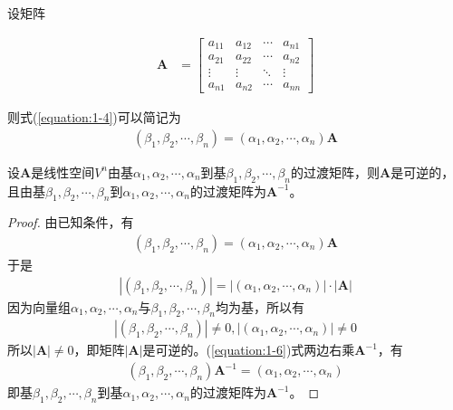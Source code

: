 设矩阵

\begin{eqnarray}
    \textbf{A}&=\left[\begin{array}{cccc}
        a_{11}&a_{12}&\cdots&a_{n1}\\
        a_{21}&a_{22}&\cdots&a_{n2}\\
        \vdots&\vdots&\ddots&\vdots\\
        a_{n1}&a_{n2}&\cdots&a_{nn}
    \end{array}\right]
\end{eqnarray}

则式(\ref{equation:1-4})可以简记为
\begin{eqnarray}
    \left(\beta_{1},\beta_{2},\cdots,\beta_{n}\right)=\left(\alpha_{1},\alpha_{2},\cdots,\alpha_{n}\right)\mathbf{A}\label{equation:1-6}
\end{eqnarray}

\begin{theorem}
    设$\mathbf{A}$是线性空间$V^{n}$由基$\alpha_{1},\alpha_{2},\cdots,\alpha_{n}$到基$\beta_{1},\beta_{2},\cdots,\beta_{n}$的过渡矩阵，则$\mathbf{A}$是可逆的，且由基$\beta_{1},\beta_{2},\cdots,\beta_{n}$到$\alpha_{1},\alpha_{2},\cdots,\alpha_{n}$的过渡矩阵为$\mathbf{A}^{-1}$。
\end{theorem}

\begin{proof}
    由已知条件，有
    \begin{eqnarray}
        \left(\beta_{1},\beta_{2},\cdots,\beta_{n}\right)=\left(\alpha_{1},\alpha_{2},\cdots,\alpha_{n}\right)\mathbf{A}\nonumber
    \end{eqnarray}
    于是
    \begin{eqnarray}
        \left|\left(\beta_{1},\beta_{2},\cdots,\beta_{n}\right)\right|=\left|\left(\alpha_{1},\alpha_{2},\cdots,\alpha_{n}\right)\right|\cdot\left|\mathbf{A}\right|\nonumber
    \end{eqnarray}
    因为向量组$\alpha_{1},\alpha_{2},\cdots,\alpha_{n}$与$\beta_{1},\beta_{2},\cdots,\beta_{n}$均为基，所以有
    \begin{eqnarray}
        \left|\left(\beta_{1},\beta_{2},\cdots,\beta_{n}\right)\right|\neq{0},\left|\left(\alpha_{1},\alpha_{2},\cdots,\alpha_{n}\right)\right|\neq{0}\nonumber
    \end{eqnarray}
    所以$\left|\mathbf{A}\right|\neq{0}$，即矩阵$\left|\mathbf{A}\right|$是可逆的。(\ref{equation:1-6})式两边右乘$\mathbf{A}^{-1}$，有
    \begin{eqnarray}
        \left(\beta_{1},\beta_{2},\cdots,\beta_{n}\right)\mathbf{A}^{-1}=\left(\alpha_{1},\alpha_{2},\cdots,\alpha_{n}\right)\nonumber
    \end{eqnarray}
    即基$\beta_{1},\beta_{2},\cdots,\beta_{n}$到基$\alpha_{1},\alpha_{2},\cdots,\alpha_{n}$的过渡矩阵为$\mathbf{A}^{-1}$。
\end{proof}

